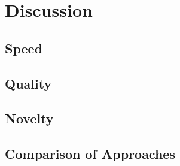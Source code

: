\chapter{Discussion}
\label{discussion}

\section{Speed}
\section{Quality}
\section{Novelty}
\section{Comparison of Approaches}
